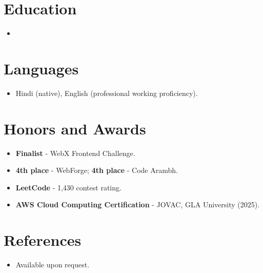 \documentclass[11pt,a4paper,sans]{moderncv}
\begin{document}
\section{Education}
\vspace{1pt}
\begin{itemize}

\item{}

\end{itemize}


\section{Languages}
\vspace{1pt}
\begin{itemize}
\item {Hindi (native), English (professional working proficiency).}
\end{itemize}


\section{Honors and Awards}
\vspace{1pt}
\begin{itemize}
\item{\textbf{Finalist} - WebX Frontend Challenge.}
\item{\textbf{4th place} - WebForge; \textbf{4th place} - Code Arambh.}
\item{\textbf{LeetCode} - 1,430 contest rating.}
\item{\textbf{AWS Cloud Computing Certification} - JOVAC, GLA University (2025).}
\end{itemize}


\section{References}
\vspace{1pt}
\begin{itemize}
\item{Available upon request.}
\end{itemize}
\end{document}
